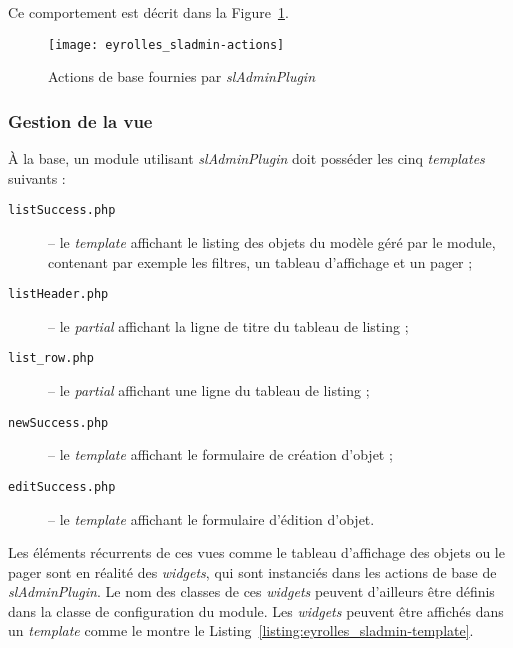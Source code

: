 Ce comportement est décrit dans la Figure~\ref{figure:eyrolles_sladmin-actions}.

\begin{figure}
	\centering
	\texttt{[image: eyrolles\_sladmin-actions]}
	\caption{Actions de base fournies par \textit{slAdminPlugin}}
	\label{figure:eyrolles_sladmin-actions}
\end{figure}

\subsubsection{Gestion de la vue}

À la base, un module utilisant \textit{slAdminPlugin} doit posséder les cinq \textit{templates} suivants :
\begin{description}
	\item[\texttt{listSuccess.php}] -- le \textit{template} affichant le listing des objets du modèle géré par le module, contenant par exemple les filtres, un tableau d'affichage et un pager ;
	\item[\texttt{listHeader.php}] -- le \textit{partial} affichant la ligne de titre du tableau de listing ;
	\item[\texttt{list\_row.php}] -- le \textit{partial} affichant une ligne du tableau de listing ;
	\item[\texttt{newSuccess.php}] -- le \textit{template} affichant le formulaire de création d'objet ;
	\item[\texttt{editSuccess.php}] -- le \textit{template} affichant le formulaire d'édition d'objet.
\end{description}

Les éléments récurrents de ces vues comme le tableau d'affichage des objets ou le pager sont en réalité des \textit{widgets}, qui sont instanciés dans les actions de base de \textit{slAdminPlugin}. Le nom des classes de ces \textit{widgets} peuvent d'ailleurs être définis dans la classe de configuration du module. Les \textit{widgets} peuvent être affichés dans un \textit{template} comme le montre le Listing~\ref{listing:eyrolles_sladmin-template}.


